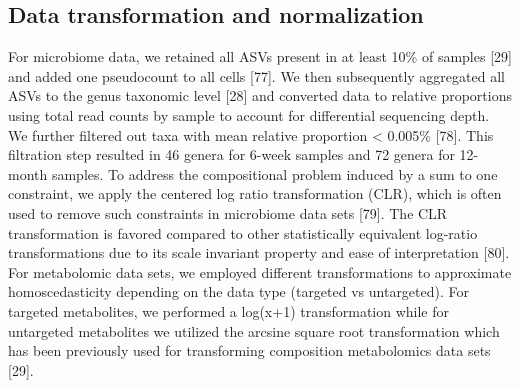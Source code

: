 \subsection{Data transformation and normalization}
For microbiome data, we retained all ASVs present in at least 10\% of samples [29] and added one pseudocount to all cells [77]. We then subsequently aggregated all ASVs to the genus taxonomic level [28] and converted data to relative proportions using total read counts by sample to account for differential sequencing depth. We further filtered out taxa with mean relative proportion < 0.005\% [78]. This filtration step resulted in 46 genera for 6-week samples and 72 genera for 12-month samples. To address the compositional problem induced by a sum to one constraint, we apply the centered log ratio transformation (CLR), which is often used to remove such constraints in microbiome data sets [79]. The CLR transformation is favored compared to other statistically equivalent log-ratio transformations due to its scale invariant property and ease of interpretation [80]. 
For metabolomic data sets, we employed different transformations to approximate homoscedasticity depending on the data type (targeted vs untargeted). For targeted metabolites, we performed a log(x+1) transformation while for untargeted metabolites we utilized the arcsine square root transformation which has been previously used for transforming composition metabolomics data sets [29].     
